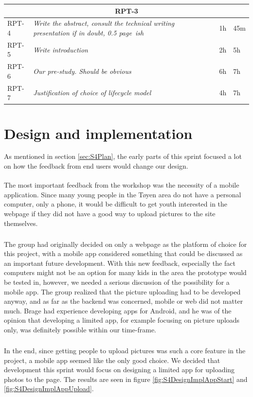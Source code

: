 %
\begin{minipage}{\linewidth}
\setlength{\tabcolsep}{12pt}
\centering
{}
\begin{tabular}{|p{1cm}|p{4cm}|p{2cm}|p{2cm}|}
\hline
\multicolumn{4}{|c|}{\cellcolor{gray!25}RPT-3} \\
\hline
RPT-4 & \it{Write the abstract, consult the technical writing presentation if in doubt, 0.5 page~ish} & 1h & 45m \\
RPT-5 & \it{Write introduction} & 2h & 5h \\
RPT-6 & \it{Our pre-study. Should be obvious} & 6h & 7h \\
RPT-7 & \it{Justification of choice of lifecycle model} & 4h & 7h \\
\hline
\end{tabular}
\end{minipage}

\section{Design and implementation}
\label{sec:S4DesignImpl}

As mentioned in section \ref{sec:S4Plan}, the early parts of this sprint focused a lot on how the feedback from end users would change our design.

\paragraph{} The most important feedback from the workshop was the necessity of a mobile application. Since many young people in the T\o yen area do not have a personal computer, only a phone, it would be difficult to get youth interested in the webpage if they did not have a good way to upload pictures to the site themselves.
\subparagraph{} The group had originally decided on only a webpage as the platform of choice for this project, with a mobile app considered something that could be discussed as an important future development. With this new feedback, especially the fact computers might not be an option for many kids in the area the prototype would be tested in, however, we needed a serious discussion of the possibility for a mobile app. The group realized that the picture uploading had to be developed anyway, and as far as the backend was concerned, mobile or web did not matter much. Brage had experience developing apps for Android, and he was of the opinion that developing a limited app, for example focusing on picture uploads only, was definitely possible within our time-frame.
\subparagraph{} In the end, since getting people to upload pictures was such a core feature in the project, a mobile app seemed like the only good choice. We decided that development this sprint would focus on designing a limited app for uploading photos to the page. The results are seen in figure \ref{fig:S4DesignImplAppStart} and \ref{fig:S4DesignImplAppUpload}.

